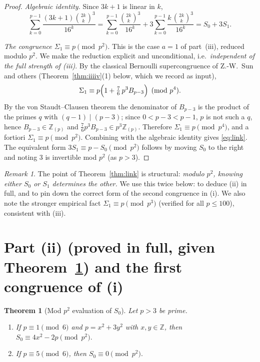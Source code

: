 \documentclass[12pt]{article}
\newtheorem{theorem}{Theorem}
\theoremstyle{remark}
\newtheorem{remark}{Remark}
\newcommand{\bin}[2]{\binom{#1}{#2}}
\begin{document}
\begin{proof}
\emph{Algebraic identity.}  Since $3k+1$ is linear in $k$,
\[
\sum_{k=0}^{p-1}\frac{(3k+1)\bin{2k}{k}^3}{16^k}
=\sum_{k=0}^{p-1}\frac{\bin{2k}{k}^3}{16^k}
+3\sum_{k=0}^{p-1}\frac{k\,\bin{2k}{k}^3}{16^k}
=S_0+3S_1 .
\]

\emph{The congruence $\Sigma_1\equiv p\pmod{p^2}$.}  This is the case $a=1$ of
part~(iii), reduced modulo $p^2$.  We make the reduction explicit and
unconditional, i.e.\ \emph{independent of the full strength of (iii)}.  By the
classical Bernoulli supercongruence of Z.-W.\ Sun and others
(Theorem~\ref{thm:iiiiv}(1) below, which we record as input),
\[
\Sigma_1\equiv p\Bigl(1+\tfrac76\,p^3B_{p-3}\Bigr)\pmod{p^{4}} .
\]
By the von Staudt--Clausen theorem the denominator of $B_{p-3}$ is the product
of the primes $q$ with $(q-1)\mid(p-3)$; since $0<p-3<p-1$, $p$ is not such a
$q$, hence $B_{p-3}\in\mathbb Z_{(p)}$ and $\tfrac76 p^3B_{p-3}\in p^3\mathbb
Z_{(p)}$.  Therefore $\Sigma_1\equiv p\pmod{p^{4}}$, and a fortiori
$\Sigma_1\equiv p\pmod{p^2}$.  Combining with the algebraic identity gives
\eqref{eq:link}.  The equivalent form $3S_1\equiv p-S_0\pmod{p^2}$ follows by
moving $S_0$ to the right and noting $3$ is invertible mod $p^2$ (as $p>3$).
\end{proof}

\begin{remark}
The point of Theorem~\ref{thm:link} is structural: \emph{modulo $p^2$, knowing
either $S_0$ or $S_1$ determines the other.}  We use this twice below: to
deduce (ii) in full, and to pin down the correct form of the second congruence
in (i).  We also note the stronger empirical fact $\Sigma_1\equiv p\pmod{p^3}$
(verified for all $p\le100$), consistent with (iii).
\end{remark}

\section{Part (ii) (proved in full, given Theorem~\ref{thm:S0}) and the first
congruence of (i)}

\begin{theorem}[Mod $p^2$ evaluation of $S_0$]\label{thm:S0}
Let $p>3$ be prime.
\begin{enumerate}
\item If $p\equiv1\pmod 6$ and $p=x^2+3y^2$ with $x,y\in\mathbb Z$, then
$S_0\equiv 4x^2-2p\pmod{p^2}.$
\item If $p\equiv5\pmod 6$, then $S_0\equiv 0\pmod{p^2}.$
\end{enumerate}
\end{theorem}
\end{document}
